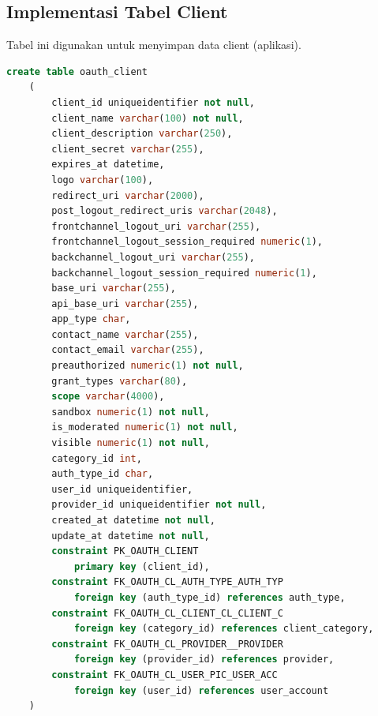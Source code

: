 \subsection{Implementasi Tabel Client}
\par Tabel ini digunakan untuk menyimpan data client (aplikasi).
\begin{lstlisting}[language=sql, firstnumber=1, caption=Implementasi Tabel Client]
    create table oauth_client
    (
        client_id uniqueidentifier not null,
        client_name varchar(100) not null,
        client_description varchar(250),
        client_secret varchar(255),
        expires_at datetime,
        logo varchar(100),
        redirect_uri varchar(2000),
        post_logout_redirect_uris varchar(2048),
        frontchannel_logout_uri varchar(255),
        frontchannel_logout_session_required numeric(1),
        backchannel_logout_uri varchar(255),
        backchannel_logout_session_required numeric(1),
        base_uri varchar(255),
        api_base_uri varchar(255),
        app_type char,
        contact_name varchar(255),
        contact_email varchar(255),
        preauthorized numeric(1) not null,
        grant_types varchar(80),
        scope varchar(4000),
        sandbox numeric(1) not null,
        is_moderated numeric(1) not null,
        visible numeric(1) not null,
        category_id int,
        auth_type_id char,
        user_id uniqueidentifier,
        provider_id uniqueidentifier not null,
        created_at datetime not null,
        update_at datetime not null,
        constraint PK_OAUTH_CLIENT
            primary key (client_id),
        constraint FK_OAUTH_CL_AUTH_TYPE_AUTH_TYP
            foreign key (auth_type_id) references auth_type,
        constraint FK_OAUTH_CL_CLIENT_CL_CLIENT_C
            foreign key (category_id) references client_category,
        constraint FK_OAUTH_CL_PROVIDER__PROVIDER
            foreign key (provider_id) references provider,
        constraint FK_OAUTH_CL_USER_PIC_USER_ACC
            foreign key (user_id) references user_account
    )
\end{lstlisting}
